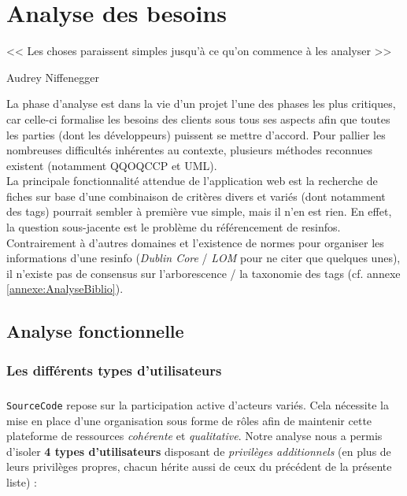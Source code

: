 \chapter{Analyse des besoins}
\label{chapter:analyseDesBesoins}

\epigraph{<< Les choses paraissent simples jusqu'à ce qu'on commence à les analyser >>}{Audrey Niffenegger}

La phase d'analyse est dans la vie d'un projet l'une des phases les plus critiques, car celle-ci formalise les besoins des clients sous tous ses aspects afin que toutes les parties (dont les développeurs) puissent se mettre d'accord. Pour pallier les nombreuses difficultés inhérentes au contexte, plusieurs méthodes reconnues existent (notamment \Gls{QQOQCCP} et UML). \\

La principale fonctionnalité attendue de l'application web est la recherche de \glspl{fiche} sur base d'une combinaison de critères divers et variés (dont notamment des \glspl{tag}) pourrait sembler à première vue simple, mais il n'en est rien. En effet, la question sous-jacente est le problème du référencement de \glspl{resinfo}. Contrairement à d'autres domaines et l'existence de normes pour organiser les informations d'une \gls{resinfo} (\textit{Dublin Core} / \textit{LOM} pour ne citer que quelques unes), il n'existe pas de consensus sur l'arborescence / la taxonomie des \glspl{tag} (cf. annexe \ref{annexe:AnalyseBiblio}).

\section{Analyse fonctionnelle}
\label{section:analyseFonctionnelle}

\subsection*{Les différents types d'utilisateurs}

\paragraph{} \texttt{SourceCode} repose sur la participation active d'acteurs variés. Cela nécessite la mise en place d'une organisation sous forme de rôles afin de maintenir cette plateforme de ressources \textit{cohérente} et \textit{qualitative}. Notre analyse nous a permis d'isoler \textbf{4 types d'utilisateurs} disposant de \textit{privilèges additionnels} (en plus de leurs privilèges propres, chacun hérite aussi de ceux du précédent de la présente liste) :

